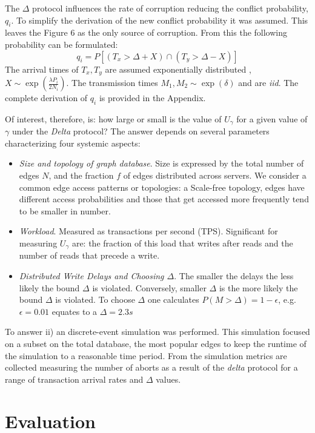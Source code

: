 \documentclass[sigplan,10pt]{acmart}
\begin{document}
The $\Delta$ protocol influences the rate of corruption reducing the conflict probability, $q_i$. To simplify the derivation of the new conflict probability it was assumed. This leaves the Figure 6 as the only source of corruption. From this the following probability can be formulated:
$$ q_i = P \left[ ( T_x >  \Delta + X) \cap (T_y > \Delta-X) \right]$$
The arrival times of $T_x,T_y$ are assumed exponentially distributed , $X \sim \exp (\frac{\lambda P_i}{2N_i})$. The transmission times $M_1, M_2 \sim \exp (\delta)$ and are \emph{iid}. The complete derivation of $q_i$ is provided in the Appendix.

Of interest, therefore, is: how large or small is the value of $U_\gamma$ for a given value of $\gamma$ under the \emph{Delta} protocol? The answer depends on several parameters characterizing four systemic aspects:
\begin{itemize}
\item \emph{Size and topology of graph database}. Size is expressed by the total number of edges $N$, and the fraction $f$ of edges distributed across servers. We consider a common edge access patterns or topologies: a Scale-free topology, edges have different access probabilities and those that get accessed more frequently tend to be smaller in number.
\item \emph{Workload}. Measured as transactions per second (TPS). Significant for measuring $U_{\gamma}$ are: the fraction of this load that writes after reads and the number of reads that precede a write.
\item \emph{Distributed Write Delays and Choosing $\Delta$}. The smaller the delays the less likely the bound $\Delta$ is violated. Conversely, smaller $\Delta$ is the more likely the bound $\Delta$ is violated. To choose $\Delta$ one calculates $P(M>\Delta) = 1 - \epsilon$, e.g. $\epsilon=0.01$ equates to a $\Delta=2.3s$
\end{itemize}

To answer ii) an discrete-event simulation was performed. This simulation focused on a subset on the total database, the most popular edges to keep the runtime of the simulation to a reasonable time period. From the simulation metrics are collected measuring the number of aborts as a result of the \emph{delta} protocol for a range of transaction arrival rates and $\Delta$ values.

\section{Evaluation}
\label{sec:evaluation}
\end{document}
